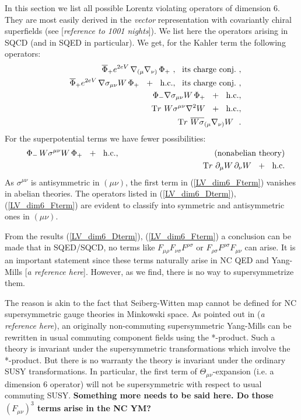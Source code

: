 \documentclass[a4paper,12pt]{article}
\begin{document}
	In this section we list all possible Lorentz violating
        operators of dimension 6. 
        They are most easily derived in the {\it vector} representation
        with covariantly chiral superfields 
	(see [\emph{reference to 1001 nights}]). 
        We list here the operators arising in SQCD (and in SQED in particular).
        We get, for the Kahler term the following operators:
\begin{eqnarray}
\label{LV_dim6_Dterm}
\nonumber
  &&  \overline{\Phi}_+ e^{2eV}\, \nabla_{(\mu} \nabla_{\nu)} \,\Phi_+ 
               ~,~~ {\rm its\ charge\ conj.}~, \\
\nonumber
  &&  \overline{\Phi}_+ e^{2eV}\, \nabla\sigma_{\mu\nu}W \,\Phi_+ 
        ~~+~~  {\rm h.c.},~~ {\rm its\ charge\ conj.}~, \\
  &&  \Phi_- \nabla\sigma_{\mu\nu}W \,\Phi_+
        ~~+~~  {\rm h.c.}, \\
\nonumber
  &&  {\mathrm Tr} ~ W\sigma^{\mu\nu}\nabla^2 W 
        ~~+~~  {\rm h.c.}, \\
\nonumber
  &&  {\mathrm Tr} ~ \overline{W \sigma}_{ (\mu}\nabla_{\nu)} W~~.
\end{eqnarray}
        For the superpotential terms we have fewer possibilities:
\begin{eqnarray}
\label{LV_dim6_Fterm}
\nonumber
      && \Phi_-\, W\sigma^{\mu\nu}W \,\Phi_+ ~~+~~ {\rm h.c.},
        ~~~~~~~~~~~~~~~~~~~~~~~~~~~~~~~~~~~{\rm (nonabelian\ theory)} \\
      && {\mathrm Tr} ~ \partial_\mu W \, \partial_\nu W ~~+~~ 
		 {\rm h.c.}
\end{eqnarray}
        As $ \sigma^{\mu\nu} $ is antisymmetric in $ (\mu\nu) $, 
	the first term in (\ref{LV_dim6_Fterm}) vanishes in 
	abelian theories.
	The operators listed in (\ref{LV_dim6_Dterm}), (\ref{LV_dim6_Fterm})
	are evident to classify into symmetric and antisymmetric
	ones in $ (\mu\nu) $.
	
	From the results (\ref{LV_dim6_Dterm}), 
	(\ref{LV_dim6_Fterm}) a conclusion can be
	made that in SQED/SQCD, no terms like 
  $ F_{\mu\rho}F_{\nu\sigma}F^{\rho\sigma} $
	or
  $ F_{\rho\sigma}F^{\rho\sigma}F_{\mu\nu} $
	can arise.
	It is an important statement since these terms naturally
	arise in NC QED and Yang-Mills [{\it a reference here}].
	However, as we find, there is no way to supersymmetrize them.

	The reason is akin to the fact that Seiberg-Witten map cannot
	be defined for NC supersymmetric gauge theories in Minkowski space.
	As pointed out in ({\it a reference here}), an originally 
	non-commuting supersymmetric Yang-Mills can be rewritten in
	usual commuting component fields using the *-product.
	Such a theory is invariant under the supersymmetric transformations
	which involve the *-product.
	But there is no warranty the theory is invariant under the
	ordinary SUSY transformations.
	In particular, the first term of $ \Theta_{\mu\nu} $-expansion 
	(i.e. a dimension 6 operator) will not be supersymmetric
	with respect to usual commuting SUSY.
	{\bf Something more needs to be said here. Do those 
	  $ (F_{\mu\nu})^3 $ terms arise in the NC YM?}
\end{document}
